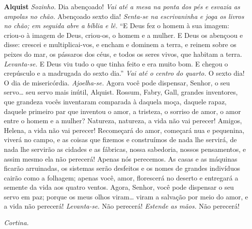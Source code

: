 \textbf{Alquist} \emph{Sozinho.} Dia abençoado! \emph{Vai até a mesa na ponta dos
pés e esvazia as ampolas no chão.} Abençoado sexto dia! \emph{Senta-se na
escrivaninha e joga os livros no chão; em seguida abre a bíblia e lê.} ``E Deus fez
o homem à sua imagem: criou-o à imagem de Deus, criou-os, o homem e a mulher. E
Deus os abençoou e disse: crescei e multiplicai-vos, e encham e dominem a terra,
e reinem sobre os peixes do mar, os pássaros dos céus, e todos os seres vivos, que
habitam a terra. \emph{Levanta-se.} E Deus viu tudo o que tinha feito e era
muito bom. E chegou o crepúsculo e a madrugada do sexto dia.'' \emph{Vai até o
centro do quarto.} O sexto dia! O dia de misericórdia. \emph{Ajoelha-se.}
Agora você pode dispensar, Senhor, o seu servo\ldots{} seu servo mais inútil,
Alquist. Rossum, Fabry, Gall, grandes inventores, que grandeza vocês inventaram
comparada à daquela moça, daquele rapaz, daquele primeiro par que inventou o amor,
a tristeza, o sorriso de amor, o amor entre o homem e a mulher? Natureza, natureza,
a vida não vai perecer! Amigos, Helena, a vida não vai perecer! Recomeçará do
amor, começará nua e pequenina, viverá no campo, e as coisas que fizemos e
construímos de nada lhe servirá, de nada lhe servirão as cidades e as
fábricas, nossa sabedoria, nossos pensamentos, e assim mesmo ela não
perecerá! Apenas nós perecemos. As casas e as máquinas ficarão arruinadas, os sistemas
serão desfeitos e os nomes de grandes indivíduos cairão como a folhagem; apenas
você, amor, florescerá no deserto e entregará a semente da vida aos quatro ventos.
Agora, Senhor, você pode dispensar o seu servo em paz; porque os meus olhos
viram\ldots{} viram a salvação por meio do amor, e a vida não perecerá!
\emph{Levanta-se.} Não perecerá! \emph{Estende as mãos.} Não perecerá!

\emph{Cortina.}
